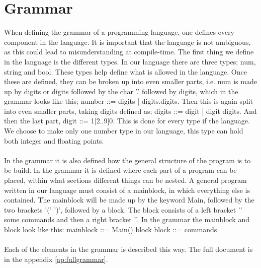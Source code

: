 \section{Grammar}
When defining the grammar of a programming language, one defines every component in the language. It is important that the language is not ambiguous, as this could lead to misunderstanding at compile-time.
The first thing we define in the language is the different types. In our language there are three types; num, string and bool. These types help define what is allowed in the language.
Once these are defined, they can be broken up into even smaller parts, i.e. num is made up by digits or digits followed by the char '.' followed by digits, which in the grammar looks like this; number ::= digits | digits.digits.
Then this is again split into even smaller parts, taking digits defined as; digits ::= digit | digit digits. And then the last part, digit ::= 1|2..9|0. This is done for every type if the language. We choose to make only one number type in our language, this type can hold both integer and floating points.\\
\\
In the grammar it is also defined how the general structure of the program is to be build. In the grammar it is defined where each part of a program can be placed, within what sections different things can be nested. A general program written in our language must consist of a mainblock, in which everything else is contained. The mainblock will be made up by the keyword Main, followed by the two brackets '(' ')', followed by a block.
The block consists of a left bracket '{' some commands and then a right bracket '}'. In the grammar the mainblock and block look like this: mainblock ::= Main() block
block ::= { commands }\\
\\
Each of the elements in the grammar is described this way. The full document is in the appendix \ref{ap:fullgrammar}.